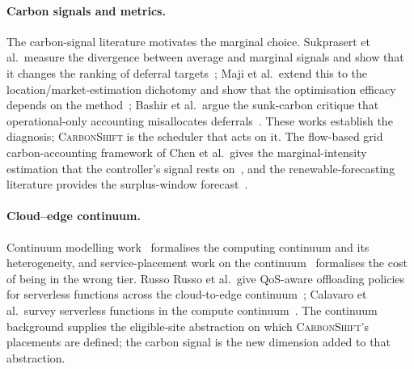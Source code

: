 \paragraph{Carbon signals and metrics.}
The carbon-signal literature motivates the marginal choice. Sukprasert et al.\ measure the divergence between average and marginal signals and show that it changes the ranking of deferral targets~\cite{sukprasert2024implications}; Maji et al.\ extend this to the location/market-estimation dichotomy and show that the optimisation efficacy depends on the method~\cite{maji2024green}; Bashir et al.\ argue the sunk-carbon critique that operational-only accounting misallocates deferrals~\cite{bashir2024sunk}. These works establish the diagnosis; \textsc{CarbonShift} is the scheduler that acts on it. The flow-based grid carbon-accounting framework of Chen et al.\ gives the marginal-intensity estimation that the controller's signal rests on~\cite{chen2024towards}, and the renewable-forecasting literature provides the surplus-window forecast~\cite{singh2025riskaware}.

\paragraph{Cloud--edge continuum.}
Continuum modelling work~\cite{patel2024modeling,aldulaimy2024computing} formalises the computing continuum and its heterogeneity, and service-placement work on the continuum~\cite{rac2024costaware,soumplis2024performance,bellavista2024exploiting} formalises the cost of being in the wrong tier. Russo Russo et al.\ give QoS-aware offloading policies for serverless functions across the cloud-to-edge continuum~\cite{russo2024qosaware}; Calavaro et al.\ survey serverless functions in the compute continuum~\cite{calavaro2025beyond}. The continuum background supplies the eligible-site abstraction on which \textsc{CarbonShift}'s placements are defined; the carbon signal is the new dimension added to that abstraction.

